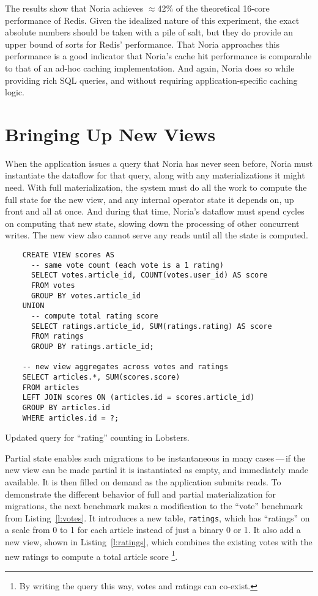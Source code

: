 The results show that Noria achieves $\approx$42\% of the theoretical 16-core
performance of Redis. Given the idealized nature of this experiment, the exact
absolute numbers should be taken with a pile of salt, but they do provide an
upper bound of sorts for Redis' performance. That Noria approaches this
performance is a good indicator that Noria's cache hit performance is comparable
to that of an ad-hoc caching implementation. And again, Noria does so while
providing rich SQL queries, and without requiring application-specific caching
logic.

\section{Bringing Up New Views}
\label{s:eval:mig}

When the application issues a query that Noria has never seen before, Noria must
instantiate the dataflow for that query, along with any materializations it
might need. With full materialization, the system must do all the work to
compute the full state for the new view, and any internal operator state it
depends on, up front and all at once. And during that time, Noria's dataflow
must spend cycles on computing that new state, slowing down the processing of
other concurrent writes. The new view also cannot serve any reads until all the
state is computed.

\begin{listing}[h]
  \begin{verbatim}
    CREATE VIEW scores AS
      -- same vote count (each vote is a 1 rating)
      SELECT votes.article_id, COUNT(votes.user_id) AS score
      FROM votes
      GROUP BY votes.article_id
    UNION
      -- compute total rating score
      SELECT ratings.article_id, SUM(ratings.rating) AS score
      FROM ratings
      GROUP BY ratings.article_id;

    -- new view aggregates across votes and ratings
    SELECT articles.*, SUM(scores.score)
    FROM articles
    LEFT JOIN scores ON (articles.id = scores.article_id)
    GROUP BY articles.id
    WHERE articles.id = ?;
  \end{verbatim}
  \caption{Updated query for ``rating'' counting in Lobsters.}
  \label{l:ratings}
\end{listing}

Partial state enables such migrations to be instantaneous in many cases\,---\,if
the new view can be made partial it is instantiated as empty, and immediately
made available. It is then filled on demand as the application submits reads.
To demonstrate the different behavior of full and partial materialization for
migrations, the next benchmark makes a modification to the ``vote'' benchmark
from Listing~\ref{l:votes}. It introduces a new table, \texttt{ratings}, which
has ``ratings'' on a scale from 0 to 1 for each article instead of just a binary
0 or 1. It also add a new view, shown in Listing~\ref{l:ratings}, which combines
the existing votes with the new ratings to compute a total article score%
\footnote{By writing the query this way, votes and ratings can co-exist.}.

